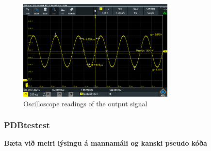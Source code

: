 \begin{figure}[h]
    \centering
    \includegraphics[width=0.70\textwidth]{graphics/ContAnalogReadOscillascope.PNG}
    \caption{Oscilloscope readings of the output signal}
    \label{fig:ContAnalOscillascope}
\end{figure}



\subsubsection{PDBtestest}

\textbf{Bæta við meiri lýsingu á mannamáli og kanski pseudo kóða}

